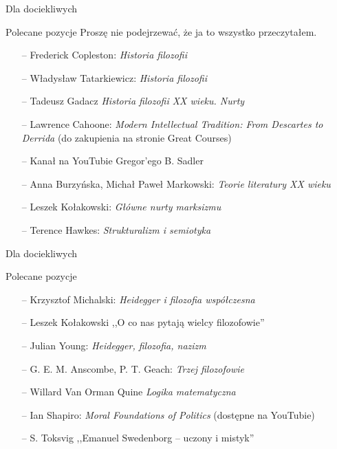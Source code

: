 \begin{frame}{Dla dociekliwych}

\begin{block}{Polecane pozycje}
Proszę nie podejrzewać, że ja to wszystko przeczytałem.
\begin{itemize}
\item[--] Frederick Copleston: \emph{Historia filozofii}
\item[--] Władysław Tatarkiewicz: \emph{Historia filozofii}
\item[--] Tadeusz Gadacz \emph{Historia filozofii XX wieku. Nurty}
\item[--] Lawrence Cahoone: \emph{Modern Intellectual Tradition: From Descartes to Derrida} (do zakupienia na stronie Great Courses)
\item[--] Kanał na YouTubie Gregor'ego B. Sadler
\item[--] Anna Burzyńska, Michał Paweł Markowski: \emph{Teorie literatury XX wieku}
\item[--] Leszek Kołakowski: \emph{Główne nurty marksizmu}
\item[--] Terence Hawkes: \emph{Strukturalizm i semiotyka}
\end{itemize}
\end{block}
\end{frame}

\begin{frame}{Dla dociekliwych}
\begin{block}{Polecane pozycje}
\begin{itemize}
\item[--] Krzysztof Michalski: \emph{Heidegger i filozofia współczesna}
\item[--] Leszek Kołakowski ,,O co nas pytają wielcy filozofowie''
\item[--] Julian Young: \emph{Heidegger, filozofia, nazizm}
\item[--] G. E. M. Anscombe, P. T. Geach: \emph{Trzej filozofowie}
\item[--] Willard Van Orman Quine \emph{Logika matematyczna}
\item[--] Ian Shapiro: \emph{Moral Foundations of Politics} (dostępne na YouTubie)
\item[--] S. Toksvig ,,Emanuel Swedenborg -- uczony i mistyk''
\end{itemize}
\end{block}
\end{frame}



